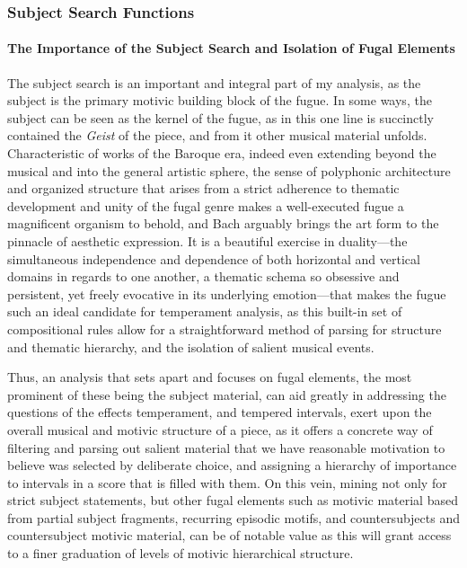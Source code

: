 \subsubsection{Subject Search Functions}\label{subject-search-functions}

\paragraph{The Importance of the Subject Search and Isolation of Fugal
Elements}\label{the-importance-of-the-subject-search-and-isolation-of-fugal-elements}

The subject search is an important and integral part of my analysis, as
the subject is the primary motivic building block of the fugue. In some
ways, the subject can be seen as the kernel of the fugue, as in this one
line is succinctly contained the \emph{Geist} of the piece, and from it
other musical material unfolds. Characteristic of works of the Baroque
era, indeed even extending beyond the musical and into the general
artistic sphere, the sense of polyphonic architecture and organized
structure that arises from a strict adherence to thematic development
and unity of the fugal genre makes a well-executed fugue a magnificent
organism to behold, and Bach arguably brings the art form to the
pinnacle of aesthetic expression. It is a beautiful exercise in
duality---the simultaneous independence and dependence of both
horizontal and vertical domains in regards to one another, a thematic
schema so obsessive and persistent, yet freely evocative in its
underlying emotion---that makes the fugue such an ideal candidate
for temperament analysis, as this built-in set of compositional rules
allow for a straightforward method of parsing for structure and thematic
hierarchy, and the isolation of salient musical events.

Thus, an analysis that sets apart and focuses on fugal elements, the
most prominent of these being the subject material, can aid greatly in
addressing the questions of the effects temperament, and tempered
intervals, exert upon the overall musical and motivic structure of a
piece, as it offers a concrete way of filtering and parsing out salient
material that we have reasonable motivation to believe was selected by
deliberate choice, and assigning a hierarchy of importance to intervals
in a score that is filled with them. On this vein, mining not only for
strict subject statements, but other fugal elements such as motivic
material based from partial subject fragments, recurring episodic
motifs, and countersubjects and countersubject motivic material, can be
of notable value as this will grant access to a finer graduation of
levels of motivic hierarchical structure.

